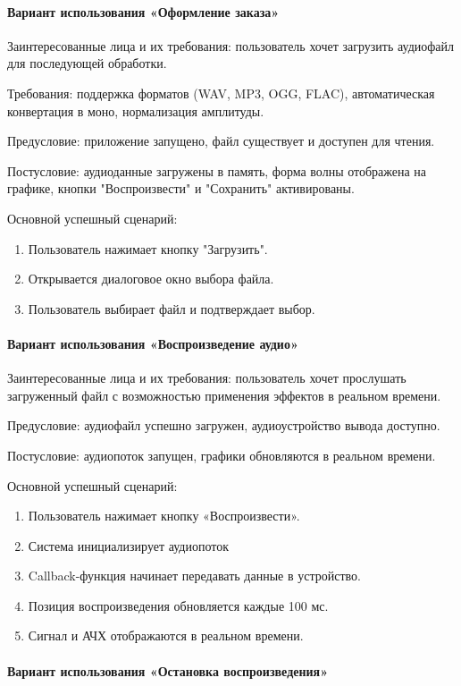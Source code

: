 \paragraph{Вариант использования «Оформление заказа»}
Заинтересованные лица и их требования: пользователь хочет загрузить аудиофайл для последующей обработки.

Требования: поддержка форматов (WAV, MP3, OGG, FLAC), автоматическая конвертация в моно, нормализация амплитуды.

Предусловие: приложение запущено, файл существует и доступен для чтения.

Постусловие: аудиоданные загружены в память, форма волны отображена на графике, кнопки "Воспроизвести" и "Сохранить" активированы.

Основной успешный сценарий:
\begin{enumerate}
	\item Пользователь нажимает кнопку "Загрузить".
	\item Открывается диалоговое окно выбора файла.
	\item Пользователь выбирает файл и подтверждает выбор.
\end{enumerate}

\paragraph{Вариант использования «Воспроизведение аудио»}

Заинтересованные лица и их требования: пользователь хочет прослушать загруженный файл с возможностью применения эффектов в реальном времени.

Предусловие: аудиофайл успешно загружен, аудиоустройство вывода доступно.

Постусловие: аудиопоток запущен, графики обновляются в реальном времени.

Основной успешный сценарий:
\begin{enumerate}
	\item Пользователь нажимает кнопку «Воспроизвести».
	\item Система инициализирует аудиопоток
	\item Callback-функция начинает передавать данные в устройство.
	\item Позиция воспроизведения обновляется каждые 100 мс.
	\item Сигнал и АЧХ отображаются в реальном времени.
\end{enumerate}

\paragraph{Вариант использования «Остановка воспроизведения»}

